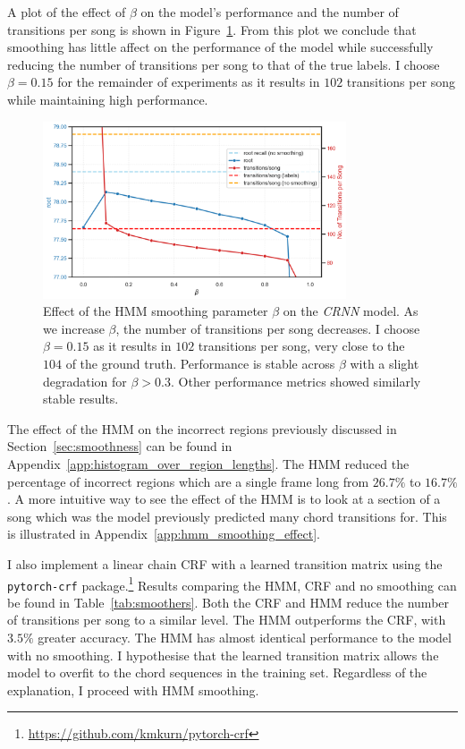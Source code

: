 A plot of the effect of $\beta$ on the model's performance and the number of transitions per song is shown in Figure~\ref{fig:hmm_beta_search}. From this plot we conclude that smoothing has little affect on the performance of the model while successfully reducing the number of transitions per song to that of the true labels. I choose $\beta = 0.15$ for the remainder of experiments as it results in $102$ transitions per song while maintaining high performance. 

\begin{figure}[ht]
    \centering
    \includegraphics[width=0.8\textwidth]{figures/hmm_beta_vs_root_transitions.png}
    \caption{Effect of the HMM smoothing parameter $\beta$ on the \emph{CRNN} model. As we increase $\beta$, the number of transitions per song decreases. I choose $\beta = 0.15$ as it results in $102$ transitions per song, very close to the $104$ of the ground truth. Performance is stable across $\beta$ with a slight degradation for $\beta > 0.3$. Other performance metrics showed similarly stable results. }\label{fig:hmm_beta_search}
\end{figure}

The effect of the HMM on the incorrect regions previously discussed in Section~\ref{sec:smoothness} can be found in Appendix~\ref{app:histogram_over_region_lengths}. The HMM reduced the percentage of incorrect regions which are a single frame long from $26.7\%$ to $16.7\%$. A more intuitive way to see the effect of the HMM is to look at a section of a song which was the model previously predicted many chord transitions for. This is illustrated in Appendix~\ref{app:hmm_smoothing_effect}.

I also implement a linear chain CRF with a learned transition matrix using the \texttt{pytorch-crf} package.\footnote{\url{https://github.com/kmkurn/pytorch-crf}} Results comparing the HMM, CRF and no smoothing can be found in Table~\ref{tab:smoothers}. Both the CRF and HMM reduce the number of transitions per song to a similar level. The HMM outperforms the CRF, with $3.5\%$ greater accuracy. The HMM has almost identical performance to the model with no smoothing. I hypothesise that the learned transition matrix allows the model to overfit to the chord sequences in the training set. Regardless of the explanation, I proceed with HMM smoothing.

